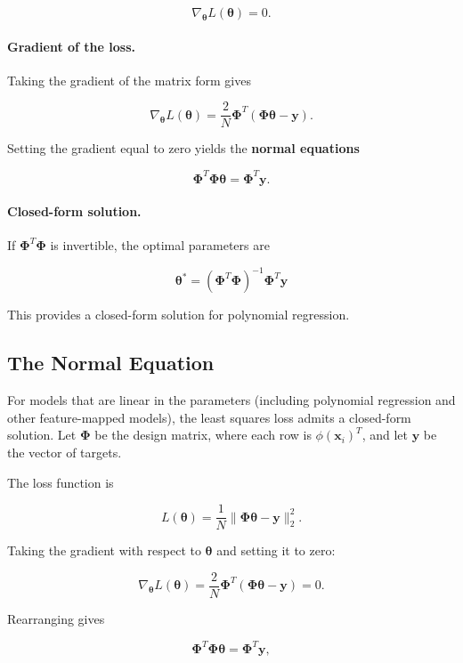 \documentclass{article}
\begin{document}
\[
\nabla_{\boldsymbol{\theta}} L(\boldsymbol{\theta}) = 0.
\]

\paragraph{Gradient of the loss.}
Taking the gradient of the matrix form gives

\[
\nabla_{\boldsymbol{\theta}} L(\boldsymbol{\theta})
= \frac{2}{N}\boldsymbol{\Phi}^T(\boldsymbol{\Phi}\boldsymbol{\theta} - \mathbf{y}).
\]

Setting the gradient equal to zero yields the \textbf{normal equations}

\[
\boldsymbol{\Phi}^T \boldsymbol{\Phi}\boldsymbol{\theta} 
= \boldsymbol{\Phi}^T \mathbf{y}.
\]

\paragraph{Closed-form solution.}
If $\boldsymbol{\Phi}^T\boldsymbol{\Phi}$ is invertible, the optimal parameters are

\[
\boxed{
\boldsymbol{\theta}^\ast
= (\boldsymbol{\Phi}^T\boldsymbol{\Phi})^{-1}\boldsymbol{\Phi}^T\mathbf{y}
}
\]

This provides a closed-form solution for polynomial regression.


\subsection{The Normal Equation}

For models that are linear in the parameters (including polynomial regression and other feature-mapped models), the least squares loss admits a closed-form solution. Let $\boldsymbol{\Phi}$ be the design matrix, where each row is $\phi(\mathbf{x}_i)^T$, and let $\mathbf{y}$ be the vector of targets.

The loss function is

\[
L(\boldsymbol{\theta}) = \frac{1}{N} \|\boldsymbol{\Phi}\boldsymbol{\theta} - \mathbf{y}\|_2^2.
\]

Taking the gradient with respect to $\boldsymbol{\theta}$ and setting it to zero:

\[
\nabla_{\boldsymbol{\theta}} L(\boldsymbol{\theta})
= \frac{2}{N}\boldsymbol{\Phi}^T(\boldsymbol{\Phi}\boldsymbol{\theta} - \mathbf{y}) = 0.
\]

Rearranging gives

\[
\boldsymbol{\Phi}^T \boldsymbol{\Phi}\boldsymbol{\theta}
= \boldsymbol{\Phi}^T \mathbf{y},
\]
\end{document}
